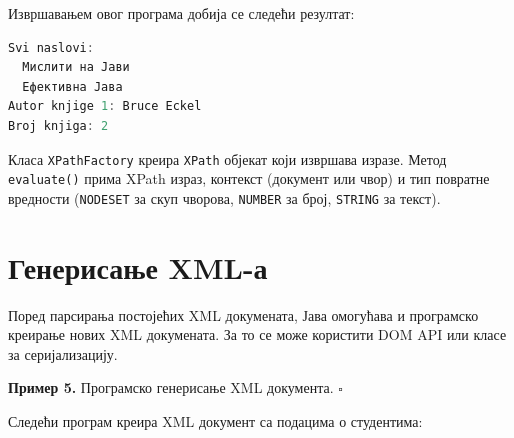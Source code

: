 Извршавањем овог програма добија се следећи резултат:


\begin{lstlisting}[language=Java]
Svi naslovi:
  Мислити на Јави
  Ефективна Јава
Autor knjige 1: Bruce Eckel
Broj knjiga: 2
\end{lstlisting}


Класа \texttt{XPathFactory} креира \texttt{XPath} објекат који извршава изразе. Метод \texttt{evaluate()} прима XPath израз, контекст (документ или чвор) и тип повратне вредности (\texttt{NODESET} за скуп чворова, \texttt{NUMBER} за број, \texttt{STRING} за текст).


\section{Генерисање XML-а}

Поред парсирања постојећих XML докумената, Јава омогућава и програмско креирање нових XML докумената. За то се може користити DOM API или класе за серијализацију.


\bigskip

\noindent \textbf{Пример 5.} Програмско генерисање XML документа. $\square$

\medskip

Следећи програм креира XML документ са подацима о студентима:


